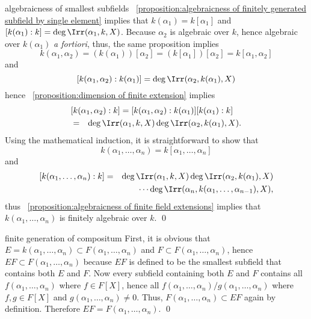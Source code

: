 \documentclass[17pt,landscape]{foils}
\begin{document}
{{{\begin{myproof}{algebraicness of smallest subfields}
	\propositionname~\ref{proposition:algebraicness of finitely generated subfield by single element}
	implies that
	$k(\alpha_1) = k[\alpha_1]$ and $[k(\alpha_1):k] = \deg \Irr(\alpha_1, k, X)$.
	Because $\alpha_2$ is algebraic over $k$, hence algebraic over $k(\alpha_1)$ \emph{a fortiori},
	thus, the same proposition implies
	$$
		k(\alpha_1, \alpha_2)
		= (k(\alpha_1))[\alpha_2]
		= (k[\alpha_1])[\alpha_2]
		= k[\alpha_1, \alpha_2]
	$$
	and
	$$
		[k(\alpha_1,\alpha_2):k(\alpha_1)] = \deg \Irr(\alpha_2,k(\alpha_1),X)
	$$
	hence \propositionname~\ref{proposition:dimension of finite extension} implies
	\begin{eqnarray*}
		\lefteqn{
		[k(\alpha_1,\alpha_2):k]
		= [k(\alpha_1,\alpha_2):k(\alpha_1)] [k(\alpha_1):k]
		}
		\\
		&=&
			\deg \Irr(\alpha_1,k,X) \deg \Irr(\alpha_2,k(\alpha_1),X).
	\end{eqnarray*}
	Using the mathematical induction,
	it is straightforward to show
	that
	$$
		k(\alpha_1, \ldots, \alpha_n) = k[\alpha_1, \ldots, \alpha_n]
	$$
	and
	\begin{eqnarray*}
			[k(\alpha_1,\ldots,\alpha_n):k] &=& \deg \Irr(\alpha_1,k,X) \deg \Irr(\alpha_2,k(\alpha_1),X)
		\\
		&&
			\cdots \deg \Irr(\alpha_n, k(\alpha_1,\ldots,\alpha_{n-1}), X),
	\end{eqnarray*}
	thus \propositionname~\ref{proposition:algebraicness of finite field extensions}
	implies that $k(\alpha_1,\ldots,\alpha_n)$ is finitely algebraic over $k$.
	\qed\
\end{myproof}

\begin{myproof}{finite generation of compositum}
	First, it is obvious that $E = k(\alpha_1, \ldots, \alpha_n) \subset F(\alpha_1, \ldots, \alpha_n)$
	and $F\subset F(\alpha_1, \ldots, \alpha_n)$,
	hence $EF\subset F(\alpha_1, \ldots, \alpha_n)$ because $EF$
	is defined to be the smallest subfield that contains both $E$ and $F$.
	Now every subfield containing both $E$ and $F$
	contains all $f(\alpha_1,\ldots,\alpha_n)$ where $f\in F[X]$,
	hence all $f(\alpha_1,\ldots,\alpha_n) / g(\alpha_1,\ldots,\alpha_n)$
	where $f,g\in F[X]$ and $g(\alpha_1,\ldots,\alpha_n)\neq0$.
	Thus, $F(\alpha_1, \ldots, \alpha_n)\subset EF$ again by definition.
	Therefore $EF = F(\alpha_1, \ldots, \alpha_n)$.
	\qed\
\end{myproof}

}}}
\end{document}
